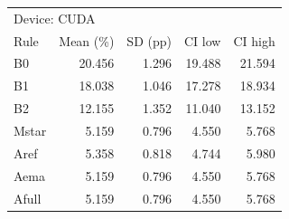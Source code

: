 \begin{tabular}{lrrrr}
\toprule
\multicolumn{5}{l}{Device: CUDA} \\
Rule & Mean (\%) & SD (pp) & CI low & CI high \\
\midrule
B0 & 20.456 & 1.296 & 19.488 & 21.594 \\
B1 & 18.038 & 1.046 & 17.278 & 18.934 \\
B2 & 12.155 & 1.352 & 11.040 & 13.152 \\
Mstar & 5.159 & 0.796 & 4.550 & 5.768 \\
Aref & 5.358 & 0.818 & 4.744 & 5.980 \\
Aema & 5.159 & 0.796 & 4.550 & 5.768 \\
Afull & 5.159 & 0.796 & 4.550 & 5.768 \\
\bottomrule
\end{tabular}
